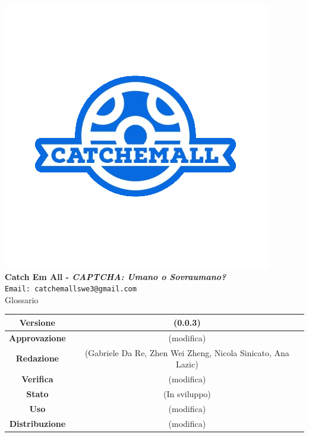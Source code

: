 \begin{titlepage}
\begin{center}
		\includegraphics[scale = 1.5]{img/logo.png}\\
		\bigskip
		\large \textbf{Catch Em All - \textit{CAPTCHA: Umano o Sovraumano?}}\\
		\texttt{Email: catchemallswe3@gmail.com}\\
		\vfill
		{\fontsize{1.5cm}{0}\selectfont Glossario}\\
		\vfill
		\renewcommand\tabularxcolumn[1]{>{\Centering}m{#1}}
		\begin{tabularx}{\textwidth}{|c|c|}
			\hline
			\textbf{Versione}      & (0.0.3)                                          \\
			\hline
			\textbf{Approvazione}  & (modifica)                                       \\
			\hline
			\textbf{Redazione}     & (Gabriele Da Re, Zhen Wei Zheng, Nicola Sinicato, Ana Lazic) \\
			\hline
			\textbf{Verifica}      & (modifica)                                       \\
			\hline
			\textbf{Stato}         & (In sviluppo)                                    \\
			\hline
			\textbf{Uso}           & (modifica)                                       \\
			\hline
			\textbf{Distribuzione} & (modifica)                                       \\
			\hline
		\end{tabularx}
	\end{center}
\end{titlepage} 
